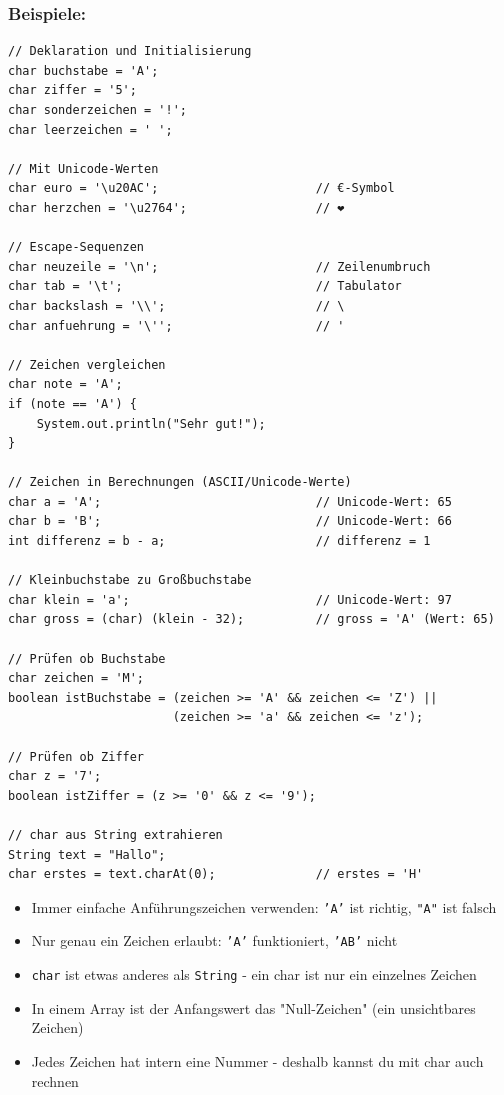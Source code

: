 \subsubsection*{Beispiele:}
\begin{lstlisting}
// Deklaration und Initialisierung
char buchstabe = 'A';
char ziffer = '5';
char sonderzeichen = '!';
char leerzeichen = ' ';

// Mit Unicode-Werten
char euro = '\u20AC';                      // €-Symbol
char herzchen = '\u2764';                  // ❤

// Escape-Sequenzen
char neuzeile = '\n';                      // Zeilenumbruch
char tab = '\t';                           // Tabulator
char backslash = '\\';                     // \
char anfuehrung = '\'';                    // '

// Zeichen vergleichen
char note = 'A';
if (note == 'A') {
    System.out.println("Sehr gut!");
}

// Zeichen in Berechnungen (ASCII/Unicode-Werte)
char a = 'A';                              // Unicode-Wert: 65
char b = 'B';                              // Unicode-Wert: 66
int differenz = b - a;                     // differenz = 1

// Kleinbuchstabe zu Großbuchstabe
char klein = 'a';                          // Unicode-Wert: 97
char gross = (char) (klein - 32);          // gross = 'A' (Wert: 65)

// Prüfen ob Buchstabe
char zeichen = 'M';
boolean istBuchstabe = (zeichen >= 'A' && zeichen <= 'Z') ||
                       (zeichen >= 'a' && zeichen <= 'z');

// Prüfen ob Ziffer
char z = '7';
boolean istZiffer = (z >= '0' && z <= '9');

// char aus String extrahieren
String text = "Hallo";
char erstes = text.charAt(0);              // erstes = 'H'
\end{lstlisting}

\begin{achtung}
	\begin{itemize}
		\item Immer einfache Anführungszeichen verwenden: \texttt{'A'} ist richtig, \texttt{"A"} ist falsch
		\item Nur genau ein Zeichen erlaubt: \texttt{'A'} funktioniert, \texttt{'AB'} nicht
		\item \texttt{char} ist etwas anderes als \texttt{String} - ein char ist nur ein einzelnes Zeichen
		\item In einem Array ist der Anfangswert das "Null-Zeichen" (ein unsichtbares Zeichen)
		\item Jedes Zeichen hat intern eine Nummer - deshalb kannst du mit char auch rechnen
	\end{itemize}
\end{achtung}

